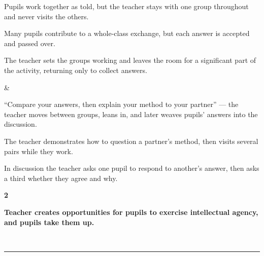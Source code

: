 \documentclass[10pt,a4paper]{article}
\newcommand{\exlistsize}{\scriptsize}
\newcommand{\conceptheader}[2]{%
  \noindent
  \begin{minipage}[c]{13mm}\raggedright
    {\fontsize{30}{30}\selectfont\bfseries\color{tnavy}#1}
  \end{minipage}%
  \begin{minipage}[c]{\dimexpr\linewidth-13mm\relax}\RaggedRight
    {\large\bfseries #2}
  \end{minipage}\\[1.5mm]
  \textcolor{tnavy}{\rule{\linewidth}{1.1pt}}\\[2mm]}
\begin{document}
{\exlistsize\begin{exlist}
  \item Pupils work together as told, but the teacher stays with one group throughout and never visits the
        others.
  \item Many pupils contribute to a whole-class exchange, but each answer is accepted and passed over.
  \item The teacher sets the groups working and leaves the room for a significant part of the activity, returning only to
        collect answers.
\end{exlist} &
\exlistsize\begin{exlist}
  \item ``Compare your answers, then explain your method to your partner'' --- the teacher moves between
        groups, leans in, and later weaves pupils' answers into the discussion.
  \item The teacher demonstrates how to question a partner's method, then visits several pairs while they
        work.
  \item In discussion the teacher asks one pupil to respond to another's answer, then asks a third whether
        they agree and why.
\end{exlist}
}
 
\clearpage

\conceptheader{2}{Teacher creates opportunities for pupils to exercise intellectual agency, and pupils
take them up.}
 
\end{document}
